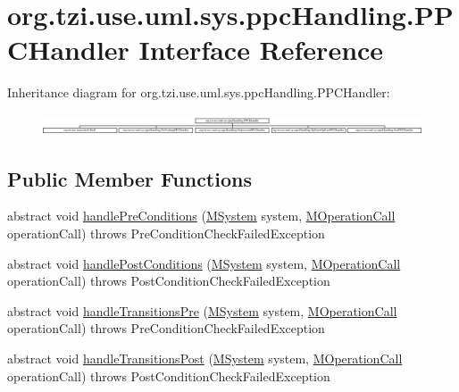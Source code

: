 \hypertarget{interfaceorg_1_1tzi_1_1use_1_1uml_1_1sys_1_1ppc_handling_1_1_p_p_c_handler}{\section{org.\-tzi.\-use.\-uml.\-sys.\-ppc\-Handling.\-P\-P\-C\-Handler Interface Reference}
\label{interfaceorg_1_1tzi_1_1use_1_1uml_1_1sys_1_1ppc_handling_1_1_p_p_c_handler}
}
Inheritance diagram for org.\-tzi.\-use.\-uml.\-sys.\-ppc\-Handling.\-P\-P\-C\-Handler\-:\begin{figure}[H]
\begin{center}
\leavevmode
\includegraphics[height=0.625698cm]{interfaceorg_1_1tzi_1_1use_1_1uml_1_1sys_1_1ppc_handling_1_1_p_p_c_handler}
\end{center}
\end{figure}
\subsection*{Public Member Functions}
\begin{DoxyCompactItemize}
\item 
abstract void \hyperlink{interfaceorg_1_1tzi_1_1use_1_1uml_1_1sys_1_1ppc_handling_1_1_p_p_c_handler_aa744045765bc399ed703649a3f6db553}{handle\-Pre\-Conditions} (\hyperlink{classorg_1_1tzi_1_1use_1_1uml_1_1sys_1_1_m_system}{M\-System} system, \hyperlink{classorg_1_1tzi_1_1use_1_1uml_1_1sys_1_1_m_operation_call}{M\-Operation\-Call} operation\-Call)  throws Pre\-Condition\-Check\-Failed\-Exception
\item 
abstract void \hyperlink{interfaceorg_1_1tzi_1_1use_1_1uml_1_1sys_1_1ppc_handling_1_1_p_p_c_handler_a569c1b79db7ba6c570c6a7eaa9e9452c}{handle\-Post\-Conditions} (\hyperlink{classorg_1_1tzi_1_1use_1_1uml_1_1sys_1_1_m_system}{M\-System} system, \hyperlink{classorg_1_1tzi_1_1use_1_1uml_1_1sys_1_1_m_operation_call}{M\-Operation\-Call} operation\-Call)  throws Post\-Condition\-Check\-Failed\-Exception
\item 
abstract void \hyperlink{interfaceorg_1_1tzi_1_1use_1_1uml_1_1sys_1_1ppc_handling_1_1_p_p_c_handler_acae587b49e99d6468d65bedb0fc1c9df}{handle\-Transitions\-Pre} (\hyperlink{classorg_1_1tzi_1_1use_1_1uml_1_1sys_1_1_m_system}{M\-System} system, \hyperlink{classorg_1_1tzi_1_1use_1_1uml_1_1sys_1_1_m_operation_call}{M\-Operation\-Call} operation\-Call)  throws Pre\-Condition\-Check\-Failed\-Exception
\item 
abstract void \hyperlink{interfaceorg_1_1tzi_1_1use_1_1uml_1_1sys_1_1ppc_handling_1_1_p_p_c_handler_a71517ed89c6459d4627fe70d143f965b}{handle\-Transitions\-Post} (\hyperlink{classorg_1_1tzi_1_1use_1_1uml_1_1sys_1_1_m_system}{M\-System} system, \hyperlink{classorg_1_1tzi_1_1use_1_1uml_1_1sys_1_1_m_operation_call}{M\-Operation\-Call} operation\-Call)  throws Post\-Condition\-Check\-Failed\-Exception
\end{DoxyCompactItemize}



